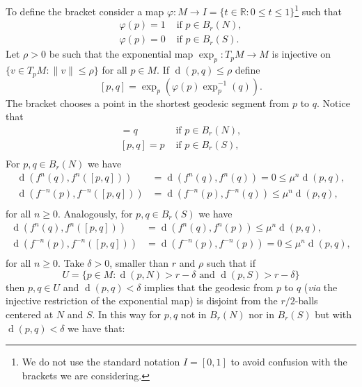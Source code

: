 \documentclass[12pt]{amsart}
\theoremstyle{plain}
\theoremstyle{definition}
\theoremstyle{remark}
\DeclareMathOperator{\dist}{d}
\newcommand{\R}{\mathbb R}
\begin{document}
To define the bracket consider a map $\varphi\colon M\to I=\{t\in\R:0\leq t\leq 1\}$\footnote{We do not use the standard notation $I=[0,1]$ to avoid confusion with the brackets we are considering.} such that
\begin{align*}
	\varphi(p)=1&\text{ if }p\in B_r(N),\\
	\varphi(p)=0&\text{ if }p\in B_r(S).
\end{align*}
Let $\rho>0$ be such that the exponential map $\exp_p\colon T_pM\to M$ is injective on $\{v\in T_pM:\|v\|\leq\rho\}$ for all $p\in M$.
If $\dist(p,q)\leq\rho$ define
$$[p,q]=\exp_p(\varphi(p)\exp_p^{-1}(q)).$$
The bracket chooses a point in the shortest geodesic segment from $p$ to $q$.
Notice that
\begin{align*}
	[p,q]=q &\text{ if }p\in B_r(N),\\
	[p,q]=p &\text{ if }p\in B_r(S),\\
\end{align*}
For $p,q\in B_r(N)$ we have
\begin{align*}
	\dist(f^{n}(q),f^{n}([p,q]))&=	\dist(f^{n}(q),f^{n}(q))=0\leq \mu^n\dist(p,q),\\
	\dist(f^{-n}(p),f^{-n}([p,q]))&=	\dist(f^{-n}(p),f^{-n}(q))\leq \mu^n\dist(p,q),\\
\end{align*}
for all $n\geq 0$.
Analogously, for $p,q\in B_r(S)$ we have
\begin{align*}
	\dist(f^{n}(q),f^{n}([p,q]))&=	\dist(f^{n}(q),f^{n}(p))\leq \mu^n\dist(p,q),\\
	\dist(f^{-n}(p),f^{-n}([p,q]))&=	\dist(f^{-n}(p),f^{-n}(p))=0\leq \mu^n\dist(p,q),\\
\end{align*}
for all $n\geq 0$.
Take $\delta>0$, smaller than $r$ and $\rho$ such that
if $$U=\{p\in M:\dist(p,N)>r-\delta\text{ and }\dist(p,S)>r-\delta\}$$
then $p,q\in U$ and $\dist(p,q)<\delta$ implies that the geodesic from $p$ to $q$ (\textit{via} the injective restriction of the exponential map) is disjoint from the $r/2$-balls centered at $N$ and $S$.
In this way for $p,q$ not in $B_r(N)$ nor in $B_r(S)$ but with $\dist(p,q)<\delta$ we have that:
\end{document}
